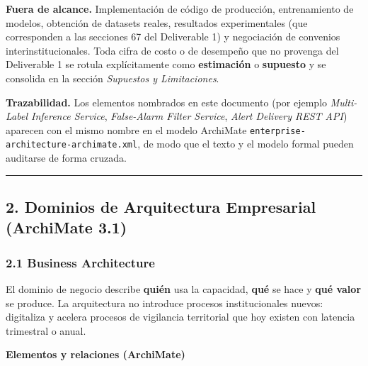 \documentclass{article}
\newcommand{\mdhfour}[1]{\par\medskip\noindent\textbf{#1}\par\nobreak\smallskip}
\begin{document}
\textbf{Fuera de alcance.} Implementación de código de producción, entrenamiento de modelos, obtención de datasets reales, resultados experimentales (que corresponden a las secciones 6\textendash{}7 del Deliverable 1) y negociación de convenios interinstitucionales. Toda cifra de costo o de desempeño que no provenga del Deliverable 1 se rotula explícitamente como \textbf{estimación} o \textbf{supuesto} y se consolida en la sección \emph{Supuestos y Limitaciones}.

\textbf{Trazabilidad.} Los elementos nombrados en este documento (por ejemplo \emph{Multi-Label Inference Service}, \emph{False-Alarm Filter Service}, \emph{Alert Delivery REST API}) aparecen con el mismo nombre en el modelo ArchiMate \texttt{enterprise-\allowbreak{}architecture-\allowbreak{}archimate.\allowbreak{}xml}, de modo que el texto y el modelo formal pueden auditarse de forma cruzada.

\par\medskip\noindent\rule{\linewidth}{0.3pt}\par\medskip

\subsection{2. Dominios de Arquitectura Empresarial (ArchiMate 3.1)}

\subsubsection{2.1 Business Architecture}

El dominio de negocio describe \textbf{quién} usa la capacidad, \textbf{qué} se hace y \textbf{qué valor} se produce. La arquitectura no introduce procesos institucionales nuevos: digitaliza y acelera procesos de vigilancia territorial que hoy existen con latencia trimestral o anual.

\mdhfour{Elementos y relaciones (ArchiMate)}
\end{document}
